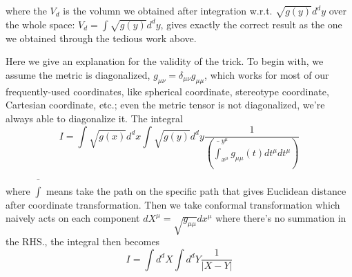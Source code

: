 \documentclass[12pt, a4paper]{article}
\numberwithin{equation}{section}
\newcommand{\be}{\begin{equation}}
\newcommand{\ee}{\end{equation}}
\begin{document}
	where the $V_d$ is the volumn we obtained after integration w.r.t. $\sqrt{g(y)}d^dy$ over the whole space: $V_d = \int \sqrt{g(y)}d^dy$, gives exactly the correct result as the one we obtained through the tedious work above.
	
	Here we give an explanation for the validity of the trick. To begin with, we assume the metric is diagonalized, $g_{\mu\nu}  = \delta_{\mu\nu}g_{\mu\mu}$, which works for most of our frequently-used coordinates, like spherical coordinate, stereotype coordinate, Cartesian coordinate, etc.; even the metric tensor is not diagonalized, we're always able to diagonalize it. The integral
\be
	I = \int \sqrt{g(x)}d^d x\int \sqrt{g(y)}d^d y \frac{1}{\left(\bar{\int}_{x^\mu}^{y^\mu}g_{\mu\mu}(t)dt^{\mu}dt^\mu\right)} 
	\label{IntegralBeforeTransformation}
\ee

	where $\bar{\int}$ means take the path on the specific path that gives Euclidean distance after coordinate transformation. Then we take conformal transformation which naively acts on each component $dX^\mu = \sqrt{g_{\mu\mu}} dx^\mu$ where there's no summation in the RHS., the integral then becomes
\be
	I = \int d^d X \int d^d Y \frac{1}{|X-Y|}
	\label{IntegralAfterTransformation}
\ee
	
\end{document}
